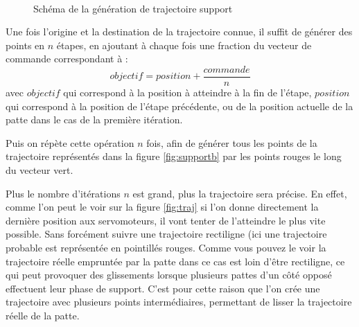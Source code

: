 \documentclass{tnreport}
\begin{document}
\begin{figure}[h]
\centering
{}\qquad
{}\\
\caption{Schéma de la génération de trajectoire support}
\label{fig:support}
\end{figure}
Une fois l'origine et la destination de la trajectoire connue, il suffit de générer des points en $n$ étapes, en ajoutant à chaque fois une fraction du vecteur de commande correspondant à :
\begin{equation}
objectif = position + \frac{commande}{n}
\end{equation}
 avec $objectif$ qui correspond à la position à atteindre à la fin de l'étape, $position$ qui correspond à la position de l'étape précédente, ou de la position actuelle de la patte dans le cas de la première itération.

Puis on répète cette opération $n$ fois, afin de générer tous les points de la trajectoire représentés dans la figure \ref{fig:supportb} par les points rouges le long du vecteur vert. 

Plus le nombre d'itérations $n$ est grand, plus la trajectoire sera précise. En effet, comme l'on peut le voir sur la figure \ref{fig:traj} si l'on donne directement la dernière position aux servomoteurs, il vont tenter de l'atteindre le plus vite possible. Sans forcément suivre une trajectoire rectiligne (ici une trajectoire probable est représentée en pointillés rouges. Comme vous pouvez le voir la trajectoire réelle empruntée par la patte dans ce cas est loin d'être rectiligne, ce qui peut provoquer des glissements lorsque plusieurs pattes d'un côté opposé effectuent leur phase de support. C'est pour cette raison que l'on crée une trajectoire avec plusieurs points intermédiaires, permettant de lisser la trajectoire réelle de la patte. 
\end{document}
